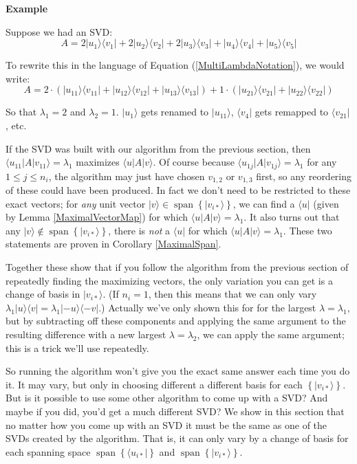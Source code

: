 \documentclass{amsbook}
\begin{document}
\begin{tcolorbox}[title=Example,colback=blue!5]
{\bfseries\Large Example}
  
Suppose we had an SVD:
$$
A=2|u_1\rangle\langle v_1|+2|u_2\rangle\langle v_2|+2|u_3\rangle\langle v_3|+|u_4\rangle\langle v_4|+|u_5\rangle\langle v_5|
$$

To rewrite this in the language of Equation (\ref{MultiLambdaNotation}), we would write:
$$
A=2\cdot\left(|u_{11}\rangle\langle v_{11}|+|u_{12}\rangle\langle v_{12}|+|u_{13}\rangle\langle v_{13}|\right)+1\cdot\left(|u_{21}\rangle\langle v_{21}|+|u_{22}\rangle\langle v_{22}|\right)
$$

So that $\lambda_1=2$ and $\lambda_2=1$.  $|u_1\rangle$ gets renamed to $|u_{11}\rangle$, $\langle v_4|$ gets remapped to $\langle v_{21}|$, etc.

\end{tcolorbox}

If the SVD was built with our algorithm from the previous section, then $\langle u_{11}|A|v_{11}\rangle=\lambda_1$ maximizes $\langle u|A|v\rangle$.  Of course because $\langle u_{1j}|A|v_{1j}\rangle=\lambda_1$ for any $1\leq j\leq n_i$, the algorithm may just have chosen $v_{1,2}$ or $v_{1,3}$ first, so any reordering of these could have been produced.  In fact we don't need to be restricted to these exact vectors; for {\em any} unit vector $|v\rangle\in\operatorname{span}\left\{|v_{i*}\rangle\right\}$, we can find a $\langle u|$ (given by Lemma \ref{MaximalVectorMap}) for which $\langle u|A|v\rangle=\lambda_1$.  It also turns out that any $|v\rangle\not\in\operatorname{span}\left\{|v_{i*}\rangle\right\}$, there is {\em not} a $\langle u|$ for which $\langle u|A|v\rangle=\lambda_1$.  These two statements are proven in Corollary \ref{MaximalSpan}.

Together these show that if you follow the algorithm from the previous section of repeatedly finding the maximizing vectors, the only variation you can get is a change of basis in $|v_{i*}\rangle$.  (If $n_i=1$, then this means that we can only vary $\lambda_1|u\rangle\langle v|=\lambda_1|-u\rangle\langle -v|$.)  Actually we've only shown this for for the largest $\lambda=\lambda_1$, but by subtracting off these components and applying the same argument to the resulting difference with a new largest $\lambda=\lambda_2$, we can apply the same argument; this is a trick we'll use repeatedly.

So running the algorithm won't give you the exact same answer each time you do it.  It may vary, but only in choosing different a different basis for each $\left\{|v_{i*}\rangle\right\}$.  But is it possible to use some other algorithm to come up with a SVD?  And maybe if you did, you'd get a much different SVD?  We show in this section that no matter how you come up with an SVD it must be the same as one of the SVDs created by the algorithm.  That is, it can only vary by a change of basis for each spanning space $\operatorname{span}\left\{\langle u_{i*}|\right\}$ and $\operatorname{span}\left\{|v_{i*}\rangle\right\}$.
\end{document}
